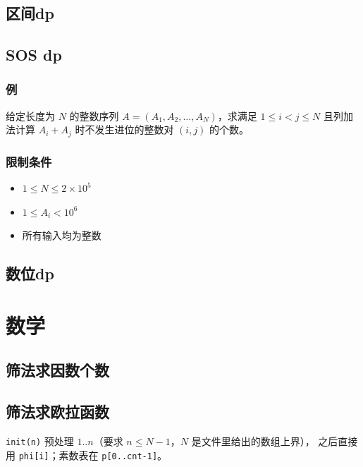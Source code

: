 \documentclass[11pt,a4paper,twocolumn]{ctexart}  %
\begin{document}
\subsection{区间dp}

\subsection{SOS dp}

\subsubsection*{例}

给定长度为 $N$ 的整数序列 $A = (A_1, A_2, \dots, A_N)$，求满足 $1 \leq i < j \leq N$ 且列加法计算 $A_i + A_j$ 时不发生进位的整数对 $(i, j)$ 的个数。

\subsubsection*{限制条件}
\begin{itemize}
    \item $1 \leq N \leq 2 \times 10^5$
    \item $1 \leq A_i < 10^6$
    \item 所有输入均为整数
\end{itemize}

\subsection{数位dp}

\clearpage
\section{数学}

\subsection{筛法求因数个数}


\subsection{筛法求欧拉函数}
\texttt{init(n)} 预处理 $1..n$（要求 $n \le N-1$，$N$ 是文件里给出的数组上界），
之后直接用 \texttt{phi[i]}；素数表在 \texttt{p[0..cnt-1]}。

\end{document}
